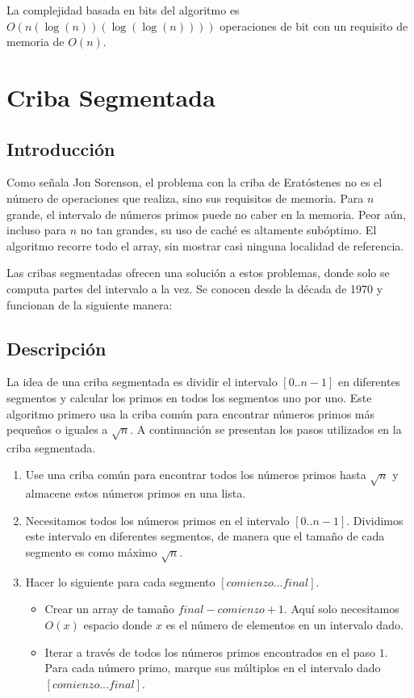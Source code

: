 \documentclass[12pt]{article}
\newcommand{\nl}{\vspace{0.3cm}}
\begin{document}
\nl

La complejidad basada en bits del algoritmo es $O(n(\log(n)) (\log(\log(n))))$ operaciones de bit con un requisito de memoria de $O(n)$.\cite{lpnsaft}

\section{Criba Segmentada}

\subsection{Introducción}

\nl

Como señala Jon Sorenson, el problema con la criba de Eratóstenes no es el número de operaciones que realiza, sino sus requisitos de memoria.\cite{aipns} Para $n$ grande, el intervalo de números primos puede no caber en la memoria. Peor aún, incluso para $n$ no tan grandes, su uso de caché es altamente subóptimo. El algoritmo recorre todo el array, sin mostrar casi ninguna localidad de referencia.

\newpage

Las cribas segmentadas ofrecen una solución a estos problemas, donde solo se computa partes del intervalo a la vez.\cite{pnap} Se conocen desde la década de 1970 y funcionan de la siguiente manera:\cite{aipns}\cite{ssepap}

\subsection{Descripción}

\nl

La idea de una criba segmentada es dividir el intervalo $[0 .. n-1]$ en diferentes segmentos y calcular los primos en todos los segmentos uno por uno. Este algoritmo primero usa la criba común para encontrar números primos más pequeños o iguales a $\sqrt{n}$. A continuación se presentan los pasos utilizados en la criba segmentada.\cite{gfgss}

\begin{enumerate}
	\item Use una criba común para encontrar todos los números primos hasta $\sqrt{n}$ y almacene estos números primos en una lista.
	\item Necesitamos todos los números primos en el intervalo $[0..n-1]$. Dividimos este intervalo en diferentes segmentos, de manera que el tamaño de cada segmento es como máximo $\sqrt{n}$.
	\item Hacer lo siguiente para cada segmento $[comienzo ... final]$.
	\begin{itemize}
		\item Crear un array de tamaño $final - comienzo + 1$. Aquí solo necesitamos $O(x)$ espacio donde $x$ es el número de elementos en un intervalo dado.
		\item Iterar a través de todos los números primos encontrados en el paso $1$. Para cada número primo, marque sus múltiplos en el intervalo dado $[comienzo ... final]$.
	\end{itemize}
\end{enumerate}
\end{document}
